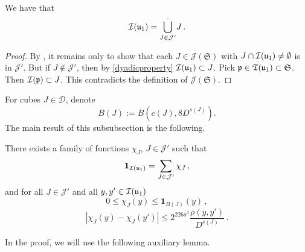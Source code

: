     \begin{lemma}
        \label{dyadic-partition-1}
        \leanok
        We have that
        $$
            {\mathcal{I}}({\mathfrak u}_1) = \dot{\bigcup_{J \in \mathcal{J}'}} J\,.
        $$
    \end{lemma}

    \begin{proof}
        \leanok
        By , it remains only to show that each $J \in \mathcal{J}(\mathfrak{S})$ with $J \cap {\mathcal{I}}({\mathfrak u}_1) \ne \emptyset$ is in $\mathcal{J}'$. But if $J \notin \mathcal{J}'$, then by \eqref{dyadicproperty} ${\mathcal{I}}({\mathfrak u}_1) \subset J$. Pick ${\mathfrak p} \in {\mathfrak T}({\mathfrak u}_1) \subset \mathfrak{S}$. Then ${\mathcal{I}}({\mathfrak p}) \subset J$. This contradicts the definition of $\mathcal{J}(\mathfrak{S})$.
    \end{proof}

    For cubes $J \in \mathcal{D}$, denote
    \begin{equation}
        \label{def-BJ}
        B(J) := B(c(J), 8D^{s(J)}).
    \end{equation}
    The main result of this subsubsection is the following.

    \begin{lemma}
        \label{Lipschitz-partition-unity}
        \leanok
        There exists a family of functions $\chi_J$, $J \in \mathcal{J}'$ such that \begin{equation}
            \label{eq-pao-1}
            \mathbf{1}_{{\mathcal{I}}({\mathfrak u}_1)} = \sum_{J \in \mathcal{J}'} \chi_J\,,
        \end{equation}
        and for all $J \in \mathcal{J}'$ and all $y,y' \in {\mathcal{I}}({\mathfrak u}_1)$
      \begin{equation}
            \label{eq-pao-2}
            0 \leq \chi_J(y) \leq \mathbf{1}_{B(J)}(y)\,,
        \end{equation}
      \begin{equation}
            \label{eq-pao-3}
            |\chi_J(y) - \chi_J(y')| \le 2^{226a^3} \frac{\rho(y,y')}{D^{s(J)}}\,.
        \end{equation}
    \end{lemma}

    In the proof, we will use the following auxiliary lemma.

